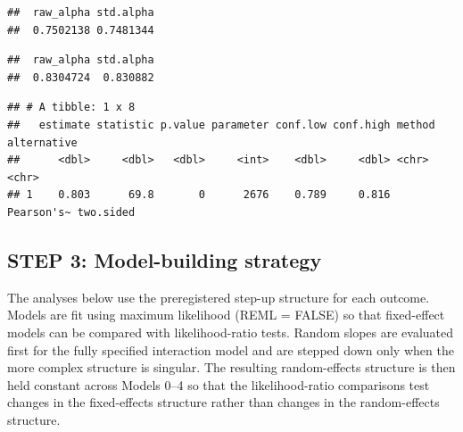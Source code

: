 \documentclass[
]{article}
\newenvironment{Shaded}{\begin{snugshade}}{\end{snugshade}}
\newcommand{\AttributeTok}[1]{\textcolor[rgb]{0.13,0.29,0.53}{#1}}
\newcommand{\CommentTok}[1]{\textcolor[rgb]{0.56,0.35,0.01}{\textit{#1}}}
\newcommand{\ConstantTok}[1]{\textcolor[rgb]{0.56,0.35,0.01}{#1}}
\newcommand{\FunctionTok}[1]{\textcolor[rgb]{0.13,0.29,0.53}{\textbf{#1}}}
\newcommand{\NormalTok}[1]{#1}
\newcommand{\SpecialCharTok}[1]{\textcolor[rgb]{0.81,0.36,0.00}{\textbf{#1}}}
\newcommand{\StringTok}[1]{\textcolor[rgb]{0.31,0.60,0.02}{#1}}
\begin{document}
\begin{verbatim}
##  raw_alpha std.alpha
##  0.7502138 0.7481344
\end{verbatim}

\begin{Shaded}
\end{Shaded}

\begin{verbatim}
##  raw_alpha std.alpha
##  0.8304724  0.830882
\end{verbatim}

\begin{Shaded}
\end{Shaded}

\begin{verbatim}
## # A tibble: 1 x 8
##   estimate statistic p.value parameter conf.low conf.high method     alternative
##      <dbl>     <dbl>   <dbl>     <int>    <dbl>     <dbl> <chr>      <chr>      
## 1    0.803      69.8       0      2676    0.789     0.816 Pearson's~ two.sided
\end{verbatim}

\subsection{STEP 3: Model-building
strategy}\label{step-3-model-building-strategy}

The analyses below use the preregistered step-up structure for each
outcome. Models are fit using maximum likelihood (REML = FALSE) so that
fixed-effect models can be compared with likelihood-ratio tests. Random
slopes are evaluated first for the fully specified interaction model and
are stepped down only when the more complex structure is singular. The
resulting random-effects structure is then held constant across Models
0--4 so that the likelihood-ratio comparisons test changes in the
fixed-effects structure rather than changes in the random-effects
structure.
\end{document}
